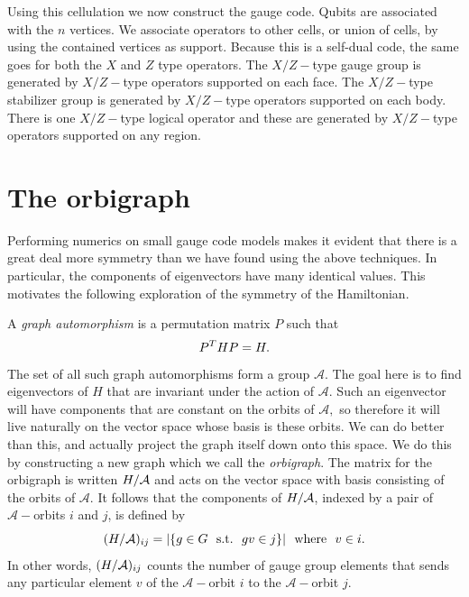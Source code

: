 \documentclass[12pt]{article}
\begin{document}
Using this cellulation we now construct the gauge code.
Qubits are associated with the $n$ vertices.
We associate operators to other cells, or union of cells,
by using the contained vertices as support.
Because this is a self-dual code, the same goes for
both the $X$ and $Z$ type operators.
The $X/Z-$type gauge group is generated by
$X/Z-$type operators supported on each face.
The $X/Z-$type stabilizer group is generated by
$X/Z-$type operators supported on each body.
There is one $X/Z-$type logical operator and these
are generated by
$X/Z-$type operators supported on any region.

%


\section{The orbigraph}

Performing numerics on small gauge code models makes
it evident that there is a great deal more symmetry than
we have found using the above techniques.
In particular, the components of eigenvectors 
have many identical values.
This motivates the following exploration of the symmetry 
of the Hamiltonian.

\def\auto{\mathcal{A}}

A \emph{graph automorphism} is a permutation matrix $P$
such that 
$$P^T H P = H.$$
The set of all such graph automorphisms 
form a group $\auto$.
The goal here is to find eigenvectors of $H$ that are
invariant under the action of $\auto.$
Such an eigenvector will have components that
are constant on the orbits of $\auto,$
so therefore it will live naturally on the
vector space whose basis is these orbits.
We can do better than this, and actually 
project the graph itself down onto this space.
We do this by constructing a new graph
which we call the \emph{orbigraph}.
The matrix for the orbigraph is written $\Ham/\auto$
and acts on the vector space with basis consisting
of the orbits of $\auto.$
It follows that the components of $\Ham/\auto$,
indexed by a pair of $\auto-$orbits $i$ and $j$, is defined by
$$
    (\Ham/\auto)_{ij} = |\{ g\in G \smbox{s.t.} gv \in j \}| \smbox{where}v\in i.
$$
In other words, 
$(\Ham/\auto)_{ij} $ counts the number of gauge group
elements that sends any particular element $v$ of the 
$\auto-$orbit $i$ to the $\auto-$orbit $j.$
\end{document}
